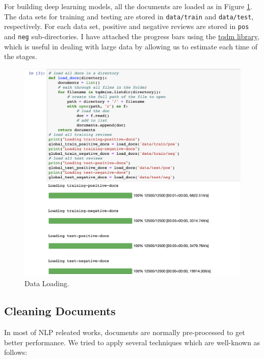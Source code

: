 \documentclass[11pt]{article}
\begin{document}
For building deep learning models, all the documents are loaded as in Figure \ref{fig:data_loading}. The data sets for training and testing are stored in \texttt{data/train} and \texttt{data/test}, respectively. For each data set, positive and negative reviews are stored in \texttt{pos} and \texttt{neg} sub-directories.
%
I have attached the progress bars using the \href{https://github.com/tqdm/tqdm}{tqdm library}, which is useful in dealing with large data by allowing us to estimate each time of the stages.

\begin{figure}[h!]
\centering 
\includegraphics[width=\textwidth]{data_loading.png}
\caption{Data Loading.}
  \label{fig:data_loading}
\end{figure}

\subsection{Cleaning Documents}

In most of NLP releated works, documents are normally pre-processed to get better performance.
We tried to apply several techniques which are well-known as follows:
\end{document}
